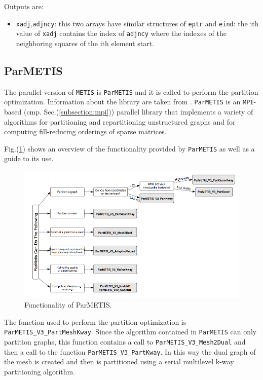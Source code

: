 Outputs are:

\begin{itemize}
\item \verb|xadj|,\verb|adjncy|: this two arrays have similar structures of \verb|eptr| and \verb|eind|: the ith value of \verb|xadj| contains the index of \verb|adjncy| where the indexes of the neighboring squares of the ith element start.
\end{itemize}

\subsection{ParMETIS}\label{subsection:parmetis}
The parallel version of \verb|METIS| is \verb|ParMETIS| and it is called to perform the partition optimization. Information about the library are taken from \cite{parmetis}. \verb|ParMETIS| is an \verb|MPI|-based (cmp. Sec.(\ref{subsection:mpi})) parallel library that implements a variety of algorithms for partitioning and repartitioning unstructured graphs and for computing fill-reducing orderings of sparse matrices.

Fig.(\ref{fig:parmetis_diagram}) shows an overview of the functionality provided by \verb|ParMETIS| as well as a guide to its use.

\begin{figure}
\centering
\includegraphics[scale=.45]{images/parmetis.png}
\caption{Functionality of ParMETIS.}
\label{fig:parmetis_diagram}
\end{figure}

The function used to perform the partition optimization is \verb|ParMETIS_V3_PartMeshKway|. Since the algorithm contained in \verb|ParMETIS| can only partition graphs, this function contains a call to \verb|ParMETIS_V3_Mesh2Dual| and then a call to the function \verb|ParMETIS_V3_PartKway|. In this way the dual graph of the mesh is created and then is partitioned using a serial multilevel k-way partitioning algorithm.

